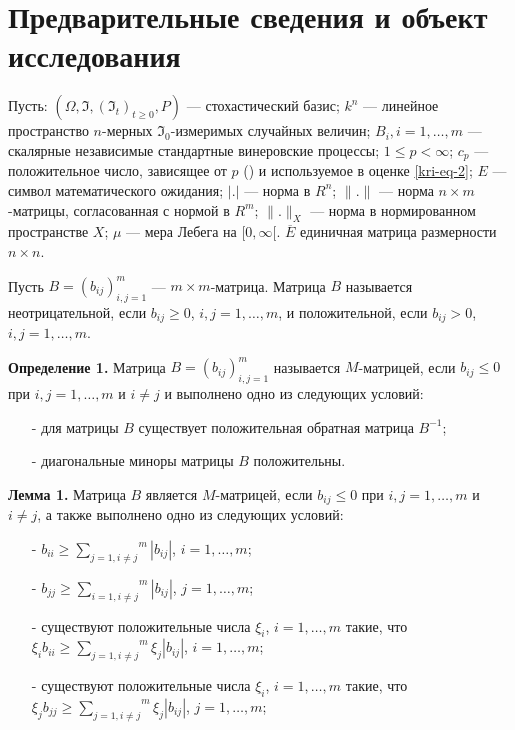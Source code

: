 \section{Предварительные сведения и объект исследования}

Пусть:  $(\Omega, \Im, (\Im_t)_{t \ge 0}, P)$ --- стохастический базис;  $k^n$ --- линейное пространство  $n$-мерных $\Im_0$-измеримых случайных величин;  $B_i, i=1, \dots, m$ --- скалярные независимые стандартные винеровские процессы; $1 \le p < \infty$;  $c_p$ --- положительное число, зависящее от $p$ (\cite[с. 65]{kri-bib-17}) и используемое в оценке \eqref{kri-eq-2}; $E$ --- символ математического ожидания; $|.|$ --- норма в $R^n$; $\|.\|$ --- норма $n \times m$-матрицы, согласованная с нормой в $R^m$; $\|.\|_X$ --- норма в нормированном пространстве  $X$; $\mu$ --- мера Лебега на $[0, \infty [$.
$\overline E$ единичная матрица размерности  $n\times n$.

Пусть $B=(b_{ij})_{i,j=1}^m$ --- $m\times m$-матрица.
Матрица  $B$ называется неотрицательной, если  $b_{ij} \ge 0$, $i,j=1, \dots ,m$, и положительной, если $b_{ij} > 0$, $i, j=1, \dots, m$.

\textbf{Определение 1. } \cite{kri-bib-18} Матрица  $B=(b_{ij})_{i,j=1}^m$ называется $M$-матрицей, если $b_{ij}\le 0$ при  $i,j=1,\dots,m$ и $i\neq j$ и выполнено одно из следующих условий:

\begin{itemize}
	\item[-]
	для матрицы  $B$ существует положительная обратная матрица $B^{-1}$;
	
	\item[-]
	диагональные миноры матрицы  $B$ положительны.
\end{itemize}

\textbf{Лемма 1.} \cite{kri-bib-18} Матрица $B$ является $M$-матрицей, если $b_{ij}\le 0$ при $i,j=1,\dots,m$ и $i\neq j$, а также выполнено одно из следующих условий:

\begin{itemize}
	\item[-]
	$b_{ii}\ge \overset m{\underset{j=1,i\neq j}{\sum }}|b_{ij}|$, $i=1,\dots,m$;
	
	\item[-]
	$b_{jj}\ge \overset m{\underset{i=1,i\neq j}{\sum }}|b_{ij}|$, $j=1,\dots,m$;
	
	\item[-]
	существуют положительные числа $\xi_i$, $i=1,\dots,m$ такие, что $\xi_ib_{ii}\ge \overset m{\underset{j=1,i\neq j}{\sum}}\xi_j|b_{ij}|$, $i=1,\dots,m$;
	
	\item[-]
	существуют положительные числа $\xi_i$, $i=1,\dots,m$ такие, что $\xi_jb_{jj}\ge \overset m{\underset{j=1,i\neq j}{\sum}}\xi_j|b_{ij}|$, $j=1,\dots,m$;
\end{itemize}

